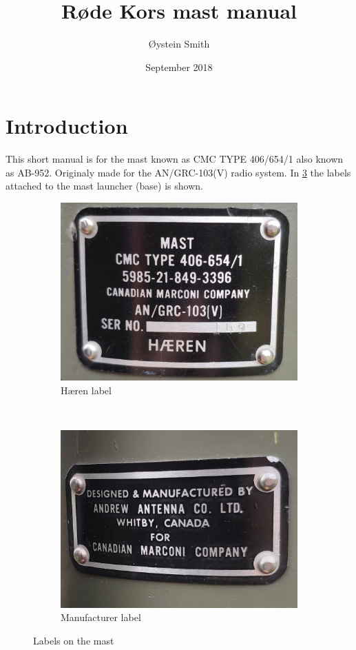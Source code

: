 \documentclass{article}
\title{Røde Kors mast manual}
\author{Øystein Smith}
\date{September 2018}
\begin{document}
\maketitle

\section{Introduction}
This short manual is for the mast known as CMC TYPE 406/654/1 also known as AB-952. Originaly made for the AN/GRC-103(V) radio system. In \cref{fig:labels} the labels attached to the mast launcher (base) is shown.

\begin{figure}[h!]
	\centering
	\begin{subfigure}{.5\textwidth}
		\centering
		\includegraphics[width=\linewidth]{img/Label1.jpg}
		\caption{Hæren label}
		\label{fig:label1}
	\end{subfigure}%
    ~
	\begin{subfigure}{.5\textwidth}
		\centering
		\includegraphics[width=\linewidth]{img/Label2.jpg}
		\caption{Manufacturer label}
		\label{fig:label2}
	\end{subfigure}
	\caption{Labels on the mast}
	\label{fig:labels}
\end{figure}
\end{document}
